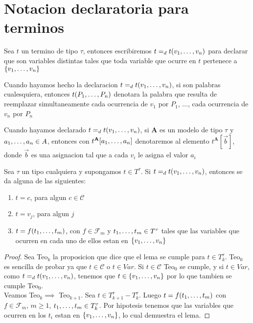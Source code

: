 
\section{Notacion declaratoria para terminos}
\begin{definition}
  Sea $t$ un termino de tipo $\tau$, entonces escribiremos $t =_d t(v_{1}, \dots, v_{n})$
  para declarar que  son variables distintas tales que toda variable que ocurre en 
  $t$ pertenece a $\{v_{1}, \dots, v_{n}\}$
\end{definition}

\begin{convention}
  Cuando hayamos hecho la declaracion $t =_d t(v_{1}, \dots, v_{n})$, si 
  son palabras cualesquiera, entonces $t(P_{1}, \dots, P_{n})$ denotara la palabra que resulta de reemplazar
  simultaneamente cada ocurrencia de $v_1$ por $P_1$, $\dots$, cada ocurrencia de $v_n$ por $P_n$
\end{convention}
\begin{convention}
  Cuando hayamos declarado $t =_d t(v_{1}, \dots, v_{n})$, si $\mathbf{A}$ es un modelo de 
  tipo $\tau$ y $a_{1}, \dots, a_{n} \in A$, entonces con $t^\mathbf{A}[a_{1}, \dots, a_{n}]$
  denotaremos al elemento $t^\mathbf{A}[\vec{b}]$, donde $\vec{b}$ es una asignacion tal que a cada
  $v_i$ le asigna el valor $a_i$
\end{convention}

\begin{lemma}
  Sea $\tau$ un tipo cualquiera y supongamos $t \in T^\tau$. Si $t =_d t(v_{1}, \dots, v_{n})$,
  entonces se da alguna de las siguientes: \begin{enumerate}
    \item $t = c$, para algun $c \in \mathcal{C}$
    \item $t = v_j$, para algun $j$
    \item $t = f(t_{1}, \dots, t_{m})$, con $f \in \mathcal{F}_m$ y $t_{1}, \dots, t_{m} \in T^\tau$ tales
    que las variables que ocurren en cada uno de ellos estan en $\{v_{1}, \dots, v_{n}\}$
  \end{enumerate}
\end{lemma}
\begin{proof}
  Sea Teo$_k$ la proposicion que dice que el lema se cumple para $t \in T_k^\tau$.
  Teo$_0$ es sencilla de probar ya que $t \in \mathcal{C}$ o $t \in Var$. Si $t \in \mathcal{C}$ Teo$_0$ se cumple, 
  y si $t \in Var$, como $t = _d t(v_{1}, \dots, v_{n})$, tenemos que $t \in \{v_{1}, \dots, v_{n}\}$ por lo que tambien se cumple Teo$_0$.\\
  Veamos Teo$_k \implies$ Teo$_{k+1}$.  Sea $t \in T_{k+1}^\tau-T_k^\tau$. Luego $t = f(t_{1}, \dots, t_{m})$ con $f\in\mathcal{F}_m$, $m\geq 1$, $t_{1}, \dots, t_{m}\in T_k^\tau$.
  Por hipotesis tenemos que las variables que ocurren en los $t_i$ estan en $\{v_{1}, \dots, v_{n}\}$, lo cual demuestra el lema. 
\end{proof}


